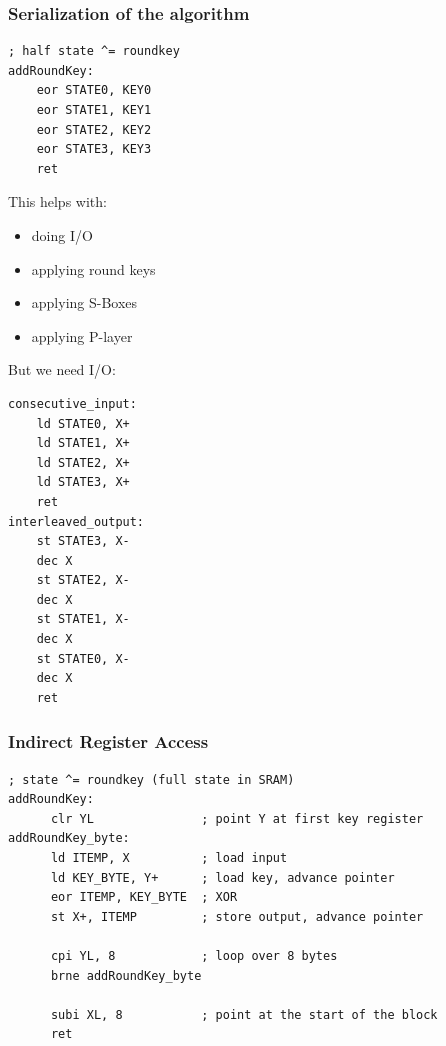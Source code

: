 \documentclass{beamer}
\begin{document}
\begin{frame}[fragile]
\frametitle{Serialization of the algorithm}
\begin{minipage}[t]{0.48\textwidth}
\begin{lstlisting}
; half state ^= roundkey
addRoundKey:
    eor STATE0, KEY0
    eor STATE1, KEY1
    eor STATE2, KEY2
    eor STATE3, KEY3
    ret
\end{lstlisting}

This helps with:
\begin{itemize}
        \item doing I/O
        \item applying round keys
        \item applying S-Boxes
        \item applying P-layer
\end{itemize}
\end{minipage}
\hfill
\begin{minipage}[t]{0.48\textwidth}
But we need I/O:
\begin{lstlisting}
consecutive_input:
    ld STATE0, X+
    ld STATE1, X+
    ld STATE2, X+
    ld STATE3, X+
    ret
interleaved_output:
    st STATE3, X-
    dec X
    st STATE2, X-
    dec X
    st STATE1, X-
    dec X
    st STATE0, X-
    dec X
    ret
\end{lstlisting}
\end{minipage}
\end{frame}

\begin{frame}[fragile]
\frametitle{Indirect Register Access}
\begin{lstlisting}
; state ^= roundkey (full state in SRAM)
addRoundKey:
      clr YL               ; point Y at first key register
addRoundKey_byte:
      ld ITEMP, X          ; load input
      ld KEY_BYTE, Y+      ; load key, advance pointer
      eor ITEMP, KEY_BYTE  ; XOR
      st X+, ITEMP         ; store output, advance pointer

      cpi YL, 8            ; loop over 8 bytes
      brne addRoundKey_byte

      subi XL, 8           ; point at the start of the block
      ret
\end{lstlisting}
\end{frame}
\end{document}
